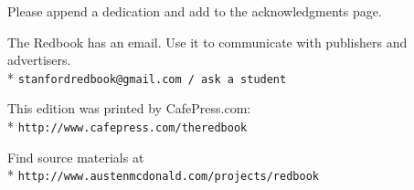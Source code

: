 \documentclass[10pt]{book}
\begin{document}
Please append a dedication and add to the acknowledgments page.

{\footnotesize
The Redbook has an email. Use it to communicate with publishers and
advertisers.\\*
\verb+stanfordredbook@gmail.com / ask a student+

This edition was printed by CafePress.com:\\*
\verb+http://www.cafepress.com/theredbook+

Find source materials at\\*
\verb+http://www.austenmcdonald.com/projects/redbook+}

\vfill\eject
\thispagestyle{empty}
\mbox{}
\vfill\eject
\thispagestyle{empty}
\mbox{}
\vfill\eject
\thispagestyle{empty}
\mbox{}
\vfill\eject
\thispagestyle{empty}
\mbox{}
\vfill\eject
\thispagestyle{empty}
\mbox{}
\vfill\eject
\thispagestyle{empty}
\mbox{}
\vfill\eject
\thispagestyle{empty}
\mbox{}
\vfill\eject
\thispagestyle{empty}
\mbox{}
\vfill\eject
\end{document}
